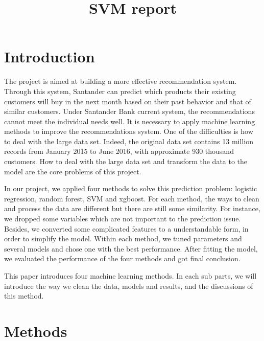 \documentclass{article}
\title{SVM report}
\begin{document}
\maketitle

\section{Introduction}
The project is aimed at building a more effective recommendation system. Through this system, Santander can predict which products their existing customers will buy in the next month based on their past behavior and that of similar customers. Under Santander Bank current system, the recommendations cannot meet the individual needs well. It is necessary to apply machine learning methods to improve the recommendations system. One of the difficulties is how to deal with the large data set. Indeed, the original data set contains 13 million records from January 2015 to June 2016, with approximate 930 thousand customers. How to deal with the large data set and transform the data to the model are the core problems of this project.

In our project, we applied four methods to solve this prediction problem: logistic regression, random forest, SVM and xgboost. For each method, the ways to clean and process the data are different but there are still some similarity.
For instance, we dropped some variables which are not important to the prediction issue. Besides, we converted some complicated features to a understandable form, in order to simplify the model. Within each method, we tuned parameters and several models and chose one with the best performance. After fitting the model, we evaluated the performance of the four methods and got final conclusion.

This paper introduces four machine learning methods. In each sub parts, we will introduce the way we clean the data, models and results, and the discussions of this method.

\section{Methods}
\end{document}
